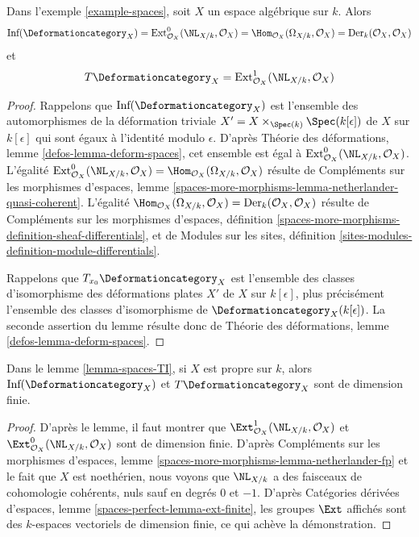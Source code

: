 \begin{lemma}
\label{lemma-spaces-TI}
Dans l'exemple \ref{example-spaces}, soit $X$ un espace algébrique sur $k$. Alors
$$
\text{Inf}(\Deformationcategory_X) =
\text{Ext}^0_{\mathcal{O}_X}(\NL_{X/k}, \mathcal{O}_X) =
\Hom_{\mathcal{O}_X}(\Omega_{X/k}, \mathcal{O}_X) =
\text{Der}_k(\mathcal{O}_X, \mathcal{O}_X)
$$
et
$$
T\Deformationcategory_X =
\text{Ext}^1_{\mathcal{O}_X}(\NL_{X/k}, \mathcal{O}_X)
$$
\end{lemma}

\begin{proof}
Rappelons que $\text{Inf}(\Deformationcategory_X)$ est l'ensemble des
automorphismes de la déformation triviale
$X' = X \times_{\Spec(k)} \Spec(k[\epsilon])$ de $X$ sur $k[\epsilon]$
qui sont égaux à l'identité modulo $\epsilon$.
D'après Théorie des déformations, lemme \ref{defos-lemma-deform-spaces},
cet ensemble est égal à $\text{Ext}^0_{\mathcal{O}_X}(\NL_{X/k}, \mathcal{O}_X)$.
L'égalité $\text{Ext}^0_{\mathcal{O}_X}(\NL_{X/k}, \mathcal{O}_X) =
\Hom_{\mathcal{O}_X}(\Omega_{X/k}, \mathcal{O}_X)$ résulte de
Compléments sur les morphismes d'espaces, lemme
\ref{spaces-more-morphisms-lemma-netherlander-quasi-coherent}.
L'égalité
$\Hom_{\mathcal{O}_X}(\Omega_{X/k}, \mathcal{O}_X) =
\text{Der}_k(\mathcal{O}_X, \mathcal{O}_X)$
résulte de Compléments sur les morphismes d'espaces, définition
\ref{spaces-more-morphisms-definition-sheaf-differentials}, et de
Modules sur les sites, définition
\ref{sites-modules-definition-module-differentials}.

\medskip\noindent
Rappelons que $T_{x_0}\Deformationcategory_X$ est l'ensemble des classes d'isomorphisme
des déformations plates $X'$ de $X$ sur $k[\epsilon]$, plus précisément
l'ensemble des classes d'isomorphisme de $\Deformationcategory_X(k[\epsilon])$.
La seconde assertion du lemme résulte donc de
Théorie des déformations, lemme \ref{defos-lemma-deform-spaces}.
\end{proof}

\begin{lemma}
\label{lemma-proper-spaces-TI}
Dans le lemme \ref{lemma-spaces-TI}, si $X$ est propre sur $k$, alors
$\text{Inf}(\Deformationcategory_X)$ et $T\Deformationcategory_X$ sont
de dimension finie.
\end{lemma}

\begin{proof}
D'après le lemme, il faut montrer que
$\Ext^1_{\mathcal{O}_X}(\NL_{X/k}, \mathcal{O}_X)$ et
$\Ext^0_{\mathcal{O}_X}(\NL_{X/k}, \mathcal{O}_X)$ sont de
dimension finie. D'après Compléments sur les morphismes d'espaces, lemme
\ref{spaces-more-morphisms-lemma-netherlander-fp}
et le fait que $X$ est noethérien, nous voyons que
$\NL_{X/k}$ a des faisceaux de cohomologie cohérents, nuls sauf
en degrés $0$ et $-1$.
D'après Catégories dérivées d'espaces, lemme \ref{spaces-perfect-lemma-ext-finite},
les groupes $\Ext$ affichés sont des $k$-espaces vectoriels de dimension finie,
ce qui achève la démonstration.
\end{proof}

